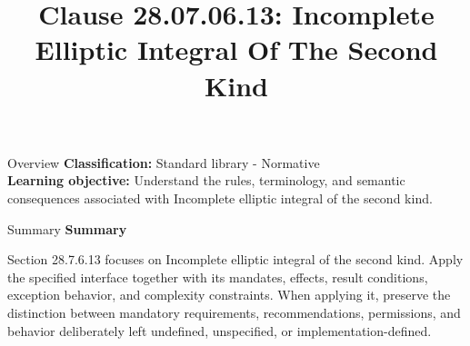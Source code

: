 \documentclass[10pt,letterpaper]{article}
\title{Clause 28.07.06.13: Incomplete Elliptic Integral Of The Second Kind}
\author{}
\date{}
\begin{document}
\maketitle
\begin{CornellOverviewBox}{Overview}
\textbf{Classification:} Standard library - Normative\\[2pt]
\textbf{Learning objective:} Understand the rules, terminology, and semantic consequences associated with Incomplete elliptic integral of the second kind.
\end{CornellOverviewBox}\begin{CornellSummaryBox}{Summary}
{\sffamily\bfseries\color{Accent} Summary}\par\vspace{3pt}Section 28.7.6.13 focuses on Incomplete elliptic integral of the second kind. Apply the specified interface together with its mandates, effects, result conditions, exception behavior, and complexity constraints. When applying it, preserve the distinction between mandatory requirements, recommendations, permissions, and behavior deliberately left undefined, unspecified, or implementation-defined.
\end{CornellSummaryBox}
\end{document}
